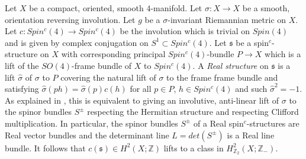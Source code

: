 \documentclass{amsart}
\theoremstyle{definition}
\theoremstyle{remark}
\numberwithin{equation}{section}
\begin{document}
Let $X$ be a compact, oriented, smooth $4$-manifold. Let $\sigma : X \to X$ be a smooth, orientation reversing involution. Let $g$ be a $\sigma$-invariant Riemannian metric on $X$. Let $c : Spin^c(4) \to Spin^c(4)$ be the involution which is trivial on $Spin(4)$ and is given by complex conjugation on $S^1 \subset Spin^c(4)$. Let $\mathfrak{s}$ be a spin$^c$-structure on $X$ with corresponding principal $Spin^c(4)$-bundle $P \to X$ which is a lift of the $SO(4)$-frame bundle of $X$ to $Spin^c(4)$. A {\em Real structure} on $\mathfrak{s}$ is a lift $\widehat{\sigma}$ of $\sigma$ to $P$ covering the natural lift of $\sigma$ to the frame frame bundle and satisfying $\widehat{\sigma}(ph) = \widehat{\sigma}(p) c(h)$ for all $p \in P$, $h \in Spin^c(4)$ and such $\widehat{\sigma}^2 = -1$. As explained in \cite{bar3}, this is equivalent to giving an involutive, anti-linear lift of $\sigma$ to the spinor bundles $S^{\pm}$ respecting the Hermitian structure and respecting Clifford multiplication. In particular, the spinor bundles $S^{\pm}$ of a Real spin$^c$-structures are Real vector bundles and the determinant line $L = det(S^{\pm})$ is a Real line bundle. It follows that $c(\mathfrak{s}) \in H^2(X ; \mathbb{Z})$ lifts to a class in $H^2_{\mathbb{Z}_2}(X ; \mathbb{Z}_-)$.
\end{document}
